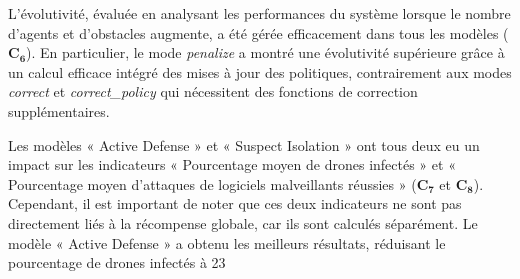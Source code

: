L'évolutivité, évaluée en analysant les performances du système lorsque le nombre d'agents et d'obstacles augmente, a été gérée efficacement dans tous les modèles ($\mathbf{C_6}$). En particulier, le mode \textit{penalize} a montré une évolutivité supérieure grâce à un calcul efficace intégré des mises à jour des politiques, contrairement aux modes \textit{correct} et \textit{correct\_policy} qui nécessitent des fonctions de correction supplémentaires.

Les modèles « Active Defense » et « Suspect Isolation » ont tous deux eu un impact sur les indicateurs « Pourcentage moyen de drones infectés » et « Pourcentage moyen d'attaques de logiciels malveillants réussies » ($\mathbf{C_7}$ et $\mathbf{C_8}$). Cependant, il est important de noter que ces deux indicateurs ne sont pas directement liés à la récompense globale, car ils sont calculés séparément. Le modèle « Active Defense » a obtenu les meilleurs résultats, réduisant le pourcentage de drones infectés à 23 %



